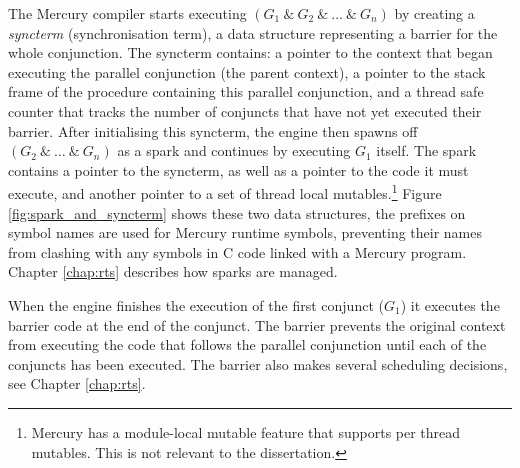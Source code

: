 The Mercury compiler starts executing $(G_1~\&~G_2~\&~\ldots~\&~G_n)$
by creating a \emph{syncterm} (synchronisation term), a data structure
representing a barrier for the whole conjunction.
The syncterm contains:
a pointer to the context that began executing the parallel conjunction
(the parent context),
a pointer to the stack frame of the procedure containing this parallel
conjunction,
and a thread safe counter that tracks the number of conjuncts that have not
yet executed their barrier.
After initialising this syncterm, the engine then
spawns off $(G_2~\&~\ldots~\&~G_n)$ as a spark and continues by executing
$G_1$ itself.
The spark contains a pointer to the syncterm,
as well as a pointer to the code it must execute,
and another pointer to a set of thread local mutables.\footnote{
    Mercury has a module-local mutable feature that supports
    per thread mutables.
    This is not relevant to the dissertation.}
Figure \ref{fig:spark_and_syncterm} shows these two data structures,
the  prefixes on symbol names are used for Mercury runtime
symbols,
preventing their names from clashing with any symbols in C code linked with
a Mercury program.
Chapter \ref{chap:rts} describes how sparks are managed.

When the engine finishes the execution of the first conjunct ($G_1$)
it executes the barrier code \joinandcontinue at the end of the conjunct.
The barrier prevents the original context from executing the code that
follows the parallel conjunction
until each of the conjuncts has been executed.
The barrier also makes several scheduling decisions, see Chapter
\ref{chap:rts}.

